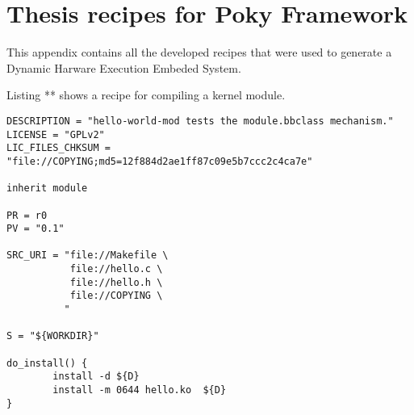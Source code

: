 \chapter{Thesis recipes for Poky Framework}
This appendix contains all the developed recipes that were used to generate a Dynamic Harware Execution Embeded System.

Listing ** shows a recipe for compiling a kernel module.

\begin{lstlisting}
DESCRIPTION = "hello-world-mod tests the module.bbclass mechanism."
LICENSE = "GPLv2"
LIC_FILES_CHKSUM = "file://COPYING;md5=12f884d2ae1ff87c09e5b7ccc2c4ca7e"

inherit module

PR = r0
PV = "0.1"

SRC_URI = "file://Makefile \
           file://hello.c \
           file://hello.h \
           file://COPYING \
          "

S = "${WORKDIR}"

do_install() {
        install -d ${D}
        install -m 0644 hello.ko  ${D}
}
\end{lstlisting}
